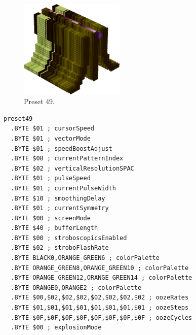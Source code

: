 \begin{minipage}[b]{0.48\linewidth}
\begin{figure}[H]                                                          
  \centering                                                             
  \begin{adjustbox}{width=5cm,center}                                   
  \includegraphics[width=5cm]{src/colorspace_presets/preset49-45.png}%
  \end{adjustbox}                                                        
\caption*{Preset 49.}                                           
\end{figure}                                                               
\end{minipage}
\hspace{0.1cm}
\begin{minipage}[b]{0.48\linewidth}                                       
\begin{lstlisting}[basicstyle=\ttfamily\tiny]
preset49
  .BYTE $01 ; cursorSpeed
  .BYTE $01 ; vectorMode
  .BYTE $01 ; speedBoostAdjust
  .BYTE $08 ; currentPatternIndex
  .BYTE $02 ; verticalResolutionSPAC
  .BYTE $01 ; pulseSpeed
  .BYTE $01 ; currentPulseWidth
  .BYTE $10 ; smoothingDelay
  .BYTE $01 ; currentSymmetry
  .BYTE $00 ; screenMode
  .BYTE $40 ; bufferLength
  .BYTE $00 ; stroboscopicsEnabled
  .BYTE $02 ; stroboFlashRate
  .BYTE BLACK0,ORANGE_GREEN6 ; colorPalette
  .BYTE ORANGE_GREEN8,ORANGE_GREEN10 ; colorPalette
  .BYTE ORANGE_GREEN12,ORANGE_GREEN14 ; colorPalette
  .BYTE ORANGE0,ORANGE2 ; colorPalette
  .BYTE $00,$02,$02,$02,$02,$02,$02,$02 ; oozeRates
  .BYTE $01,$01,$01,$01,$01,$01,$01,$01 ; oozeSteps
  .BYTE $0F,$0F,$0F,$0F,$0F,$0F,$0F,$0F ; oozeCycles
  .BYTE $00 ; explosionMode
\end{lstlisting}
\end{minipage}

